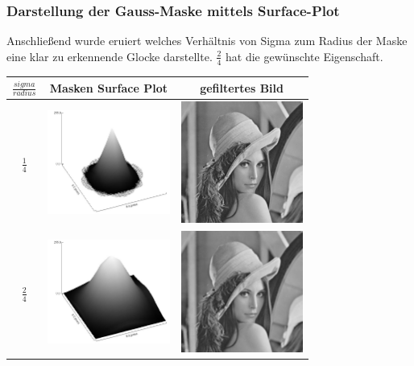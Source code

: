 \documentclass[12pt,german]{article}
\begin{document}
\subsubsection{Darstellung der Gauss-Maske mittels Surface-Plot}
Anschließend wurde eruiert welches Verhältnis von Sigma zum Radius der Maske eine klar zu erkennende Glocke darstellte. $ \frac{2}{4} $ hat die gewünschte Eigenschaft. 
\begin{table}[H]
  \centering
  \begin{tabular}{| c | c | c |}
    \hline
    $ \frac{sigma}{radius} $ & Masken Surface Plot & gefiltertes Bild \\
    \hline
    $ \frac{1}{4} $ &
	\includegraphics[width=4cm]{../testData/Gauss/GaussBellR4S1.jpg} & 	\includegraphics[width=4cm]{../testData/Gauss/LenaR4S1.jpg} \\
	    \hline
    $ \frac{2}{4} $ &
	\includegraphics[width=4cm]{../testData/Gauss/GaussBellR4S2.jpg} & 	\includegraphics[width=4cm]{../testData/Gauss/LenaR4S2.jpg} \\

\end{tabular}
\end{table}
\end{document}
